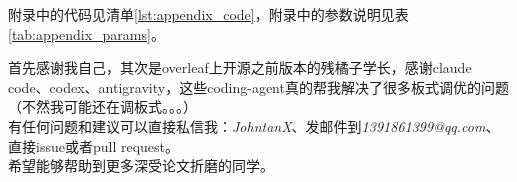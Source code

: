 \documentclass[UTF8,AutoFakeBold=1,AutoFakeSlant,zihao=-4]{SCAU}
\begin{document}
附录中的代码见清单\ref{lst:appendix_code}，附录中的参数说明见表\ref{tab:appendix_params}。

\begin{acknowledgement}
  首先感谢我自己，其次是overleaf上开源之前版本的残橘子学长，感谢claude code、codex、antigravity，这些coding-agent真的帮我解决了很多板式调优的问题（不然我可能还在调板式。。。）\\
  有任何问题和建议可以直接私信我：\textit{JohntanX}、发邮件到\textit{1391861399@qq.com}、直接issue或者pull request。\\
  希望能够帮助到更多深受论文折磨的同学。
\end{acknowledgement}
\end{document}

